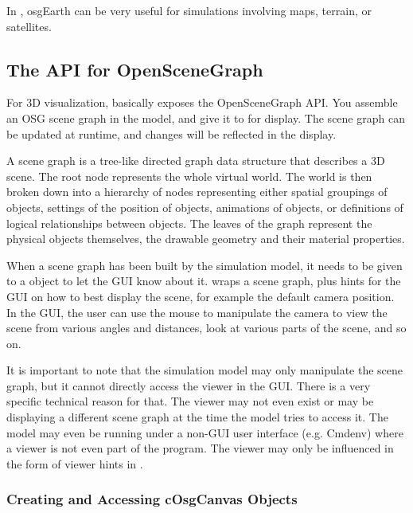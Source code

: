 In \opp, osgEarth can be very useful for simulations involving maps, terrain,
or satellites.

\subsection{The {\opp} API for OpenSceneGraph}
\label{sec:graphics:opp-api-for-osg}

For 3D visualization, {\opp} basically exposes the OpenSceneGraph API.
You assemble an OSG scene graph in the model, and give it to {\opp} for
display. The scene graph can be updated at runtime, and changes will be
reflected in the display.

\begin{note}
 A scene graph is a tree-like directed graph
data structure that describes a 3D scene. The root node represents the
whole virtual world. The world is then broken down into a hierarchy of
nodes representing either spatial groupings of objects, settings of
the position of objects, animations of objects, or definitions of
logical relationships between objects. The leaves of the graph
represent the physical objects themselves, the drawable geometry and
their material properties.
\end{note}

When a scene graph has been built by the simulation model, it needs to be
given to a  object to let the {\opp} GUI know about it.
 wraps a scene graph, plus hints for the GUI on how to
best display the scene, for example the default camera position. In the
GUI, the user can use the mouse to manipulate the camera to view the scene
from various angles and distances, look at various parts of the scene,
and so on.

It is important to note that the simulation model may only
manipulate the scene graph, but it cannot directly access the viewer
in the GUI. There is a very specific technical reason for that.
The viewer may not even exist or may be displaying a different
scene graph at the time the model tries to access it. The model
may even be running under a non-GUI user interface (e.g. Cmdenv)
where a viewer is not even part of the program. The viewer may
only be influenced in the form of viewer hints in
.


\subsubsection{Creating and Accessing cOsgCanvas Objects}
\label{sec:graphics:creating-and-accessing-osgcanvas-objects}


